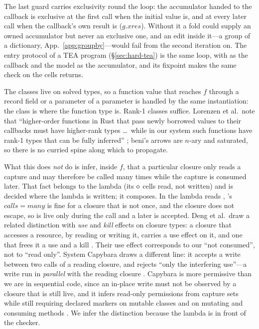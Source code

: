 The last guard carries exclusivity round the loop: the accumulator handed to the callback is exclusive
at the first call when the initial value is, and at every later call when the callback's own result is
($g.\mathit{xres}$). Without it a fold could supply an owned accumulator but never an exclusive one,
and an edit inside it---a group of a dictionary, App.~\ref{app:groupby}---would fail from the second
iteration on. The entry protocol of a TEA program (\S\ref{sec:hard-tea}) is the same loop, with
 as the callback and the model as the accumulator, and its fixpoint makes the same check on
the cells  returns.

The classes live on solved types, so a function value that reaches $f$ through a record field or a
parameter of a parameter is handled by the same instantiation: the class is where the function type
is. Rank-1 classes suffice. Lorenzen et al.\ note that ``higher-order functions in Rust that pass newly
borrowed values to their callbacks must have higher-rank types \ldots\ while in our system such
functions have rank-1 types that can be fully inferred'' \citep[\S8.3]{lorenzen2024oxidizing}; beni's
arrows are $n$-ary and saturated, so there is no curried spine along which to propagate.

What this does \emph{not} do is infer, inside $f$, that a particular closure only reads a capture and
may therefore be called many times while the capture is consumed later. That fact belongs to the
lambda (its $\diamond$ cells read, not written) and is decided where the lambda is written; it composes.
In  the lambda reads , 's $\mathit{calls} =
\mathit{many}$ is fine for a closure that is not once, and the closure does not escape, so 
is live only during the  call and a later \code{[ …ys, y ]} is accepted. Deng et al.\ draw a
related distinction with \emph{use} and \emph{kill} effects on closure types: a closure that accesses
a resource, by reading or writing it, carries a use effect on it, and one that frees it a use and a kill
\citep[Fig.~1, \S2.2]{deng2025capture}. Their use effect corresponds to our ``not consumed'', not to
``read only''. System Capybara draws a different line: it accepts a write between two calls of a reading
closure, and rejects ``only the interfering use''---a write run in \emph{parallel} with the reading
closure \citep[\S2.2]{xu2026capybara}. Capybara is more permissive than we are in sequential code,
since an in-place write must not be observed by a closure that is still live, and it infers read-only
permissions from capture sets while still requiring declared markers on mutable classes and on
mutating and consuming methods \citep[\S6.1]{xu2026capybara}. We infer the distinction because the
lambda is in front of the checker.

